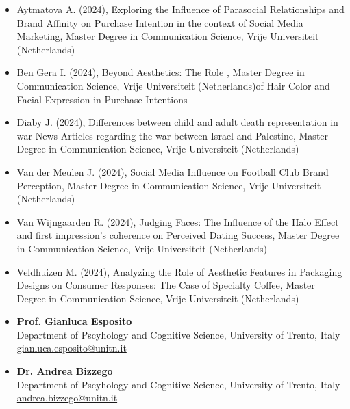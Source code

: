 \documentclass[10pt,a4paper]{altacv}
\begin{document}
\begin{fullwidth}
		\newpage
		\begin{itemize}
			
			\item Aytmatova A. (2024), Exploring the Influence of Parasocial Relationships and Brand Affinity on
			Purchase Intention in the context of Social Media Marketing, Master Degree in Communication Science, Vrije Universiteit (Netherlands)
			
			\item Ben Gera I. (2024), Beyond Aesthetics: The Role , Master Degree in Communication Science, Vrije Universiteit (Netherlands)of Hair Color and Facial Expression in Purchase Intentions
			
			\item Diaby J. (2024), Differences between child and adult death representation in war News Articles regarding the war between Israel and Palestine, Master Degree in Communication Science, Vrije Universiteit (Netherlands)
			
			\item Van der Meulen J. (2024), Social Media Influence on Football Club Brand Perception, Master Degree in Communication Science, Vrije Universiteit (Netherlands)
			
			\item Van Wijngaarden R. (2024), Judging Faces: The Influence of the Halo Effect and first impression’s coherence on Perceived Dating Success, Master Degree in Communication Science, Vrije Universiteit (Netherlands)
			
			\item Veldhuizen M. (2024), Analyzing the Role of Aesthetic Features in Packaging Designs  on Consumer Responses: The 	Case of Specialty Coffee, Master Degree in Communication Science, Vrije Universiteit (Netherlands)

		\end{itemize}
		
		
		
		\begin{itemize}
			\item \textbf{Prof. Gianluca Esposito}\\
			Department of Pscyhology and Cognitive Science, University of Trento, Italy\\
			\href{mailto:gianluca.esposito@unitn.it}{gianluca.esposito@unitn.it}

			\item \textbf{Dr. Andrea Bizzego}\\
			Department of Pscyhology and Cognitive Science, University of Trento, Italy\\
			\href{mailto:andrea.bizzego@unitn.it}{andrea.bizzego@unitn.it}
			

\end{itemize}
\end{fullwidth}
\end{document}
